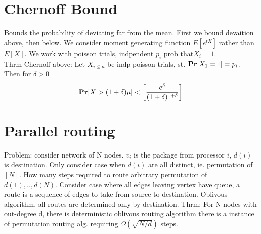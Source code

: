 \documentclass[a4paper]{article}
\def\Pr{\mbox{\textbf{Pr}}}
\begin{document}
\section{Chernoff Bound}
Bounds the probability of deviating far from the mean. First we bound devaition above, then below. We consider moment generating function \(E[e^{tX}]\) rather than \(E[X]\). We work with poisson trials, indpendent \(p_i\) prob that\(X_i=1\).\\
Thrm Chernoff above: Let \(X_{i\leq n}\) be indp poisson trials, st. \(\Pr[X_1 = 1] = p_i\). Then for \(\delta > 0\) 
\[\Pr[X>(1+\delta)\mu] < \left[\frac{e^\delta}{(1+\delta)^{1+\delta}}\right]\]

\section{Parallel routing}
Problem: consider network of N nodes. \(v_i\) is the package from processor \(i\), \(d(i)\) is destination. Only consider case when \(d(i)\) are all distinct, ie. permutation of \([N]\). How many steps required to route arbitrary permutation of \(d(1),..,d(N)\).
Consider case where all edges leaving vertex have queue, a route is a sequence of edges to take from source to destination. Oblivous algorithm, all routes are determined only by destination. 
Thrm: For N nodes with out-degree d, there is deterministic oblivous routing algorithm there is a instance of permutation routing alg. requiring \(\Omega(\sqrt{N/d})\) steps.
\end{document}
